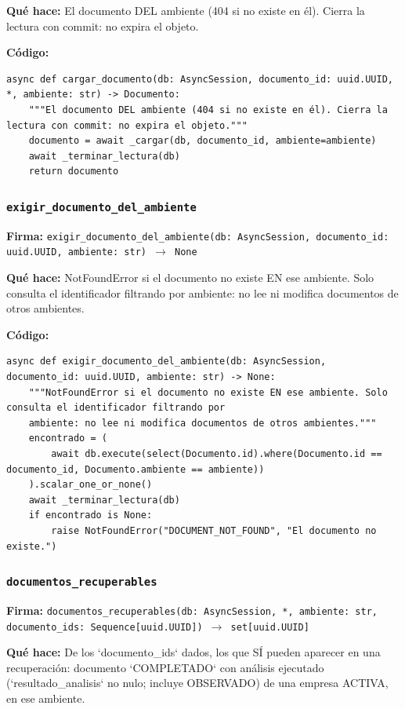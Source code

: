 \documentclass[11pt,a4paper]{article}
\begin{document}
\textbf{Qué hace:} El documento DEL ambiente (404 si no existe en él). Cierra la lectura con commit: no expira el objeto.

\textbf{Código:}
\begin{lstlisting}
async def cargar_documento(db: AsyncSession, documento_id: uuid.UUID, *, ambiente: str) -> Documento:
    """El documento DEL ambiente (404 si no existe en él). Cierra la lectura con commit: no expira el objeto."""
    documento = await _cargar(db, documento_id, ambiente=ambiente)
    await _terminar_lectura(db)
    return documento
\end{lstlisting}

\subsubsection*{\texttt{exigir\_documento\_del\_ambiente}}
\textbf{Firma:} \texttt{exigir\_documento\_del\_ambiente(db: AsyncSession, documento\_id: uuid.UUID, ambiente: str) $\rightarrow$ None}

\textbf{Qué hace:} NotFoundError si el documento no existe EN ese ambiente. Solo consulta el identificador filtrando por
ambiente: no lee ni modifica documentos de otros ambientes.

\textbf{Código:}
\begin{lstlisting}
async def exigir_documento_del_ambiente(db: AsyncSession, documento_id: uuid.UUID, ambiente: str) -> None:
    """NotFoundError si el documento no existe EN ese ambiente. Solo consulta el identificador filtrando por
    ambiente: no lee ni modifica documentos de otros ambientes."""
    encontrado = (
        await db.execute(select(Documento.id).where(Documento.id == documento_id, Documento.ambiente == ambiente))
    ).scalar_one_or_none()
    await _terminar_lectura(db)
    if encontrado is None:
        raise NotFoundError("DOCUMENT_NOT_FOUND", "El documento no existe.")
\end{lstlisting}

\subsubsection*{\texttt{documentos\_recuperables}}
\textbf{Firma:} \texttt{documentos\_recuperables(db: AsyncSession, *, ambiente: str, documento\_ids: Sequence[uuid.UUID]) $\rightarrow$ set[uuid.UUID]}

\textbf{Qué hace:} De los `documento\_ids` dados, los que SÍ pueden aparecer en una recuperación: documento
`COMPLETADO` con análisis ejecutado (`resultado\_analisis` no nulo; incluye OBSERVADO) de una empresa
ACTIVA, en ese ambiente.
\end{document}
